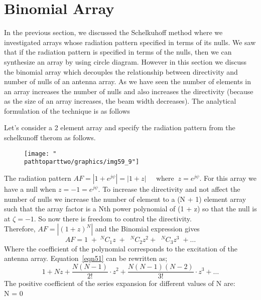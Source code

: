 \chapter{Binomial Array}	
In the previous section, we discussed the Schelkuhoff method where we investigated arrays whose radiation pattern specified in terms of its nulls. We saw that if the radiation pattern is specified in terms of the nulls, then we can synthesize an array by using circle diagram. However in this section we discuss the binomial array which decouples the relationship between directivity and number of nulls of an antenna array. As we have seen the number of elements in an array increases the number of nulls and also increases the directivity (because as the size of an array increases, the beam width decreases). The analytical formulation of the technique is as follows

Let's consider a 2 element array and specify the radiation pattern from the schelkunoff therom as follows.\\
\begin{figure}[h]
\centering
\texttt{[image: "\\pathtoparttwo/graphics/img59\_9"]}
\caption{}
\label{fig:fig-11}
\end{figure}

The radiation pattern $AF = |1 + e^{j\psi}| = |1 + z| \; \; \; \; \; \text{where} \; \; z =  e^{j\psi}$. For this array we have a null when $z = -1 =  e^{j\psi}$. To increase the directivity and not affect the number of nulls we increase the number of element to a (N + 1) element array such that the array factor is a Nth power polynomial of (1 + z) so that the null is at $\zeta = -1$. So now there is freedom to control the directivity.\\
Therefore, $AF = |(1 + z)^N|$ and the Binomial expression gives 
\begin{equation}
AF = 1\;  +\;  {^NC_1z} \; +\; \; {^NC_2z^2} +\; \; {^NC_3z^3} \; + \ldots
\label{eqn51}
\end{equation}
Where the coefficient of the polynomial corresponds to the excitation of the antenna array. Equation~\ref{eqn51} can be rewritten as;
\begin{equation}
1 + Nz + \dfrac{N(N - 1)}{2!}\cdot z^2 + \dfrac{N(N - 1)(N - 2)}{3!}\cdot z^3 + \ldots\label{eqn52}
\end{equation}
The positive coefficient of the series expansion for different values of N are:\\

N = 0\; \; \; \; \; \; \; \; \; \; \; \; \; \; \;\; \; \; \; \\

